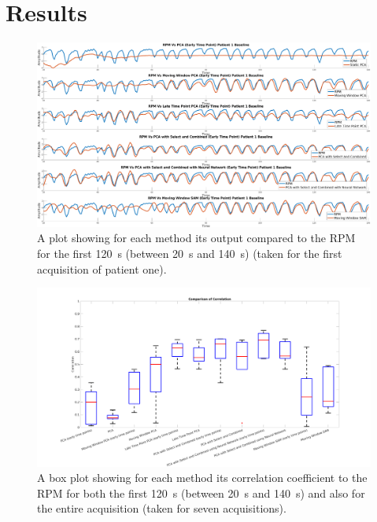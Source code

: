 \section{Results} \label{sec:results}
    \begin{figure}
        \centering
        
        \includegraphics[width=1.0\linewidth]{figures/patient_one_output.png}
        
        \captionsetup{singlelinecheck=false, justification=centering}
        \caption{
        \scriptsize
        A plot showing for each method its output compared to the \gls{RPM} for the first \SI{120}{\second} (between \SI{20}{\second} and \SI{140}{\second}) (taken for the first acquisition of patient one).}
        \label{fig:patient_one_output}
    \end{figure}
    
    \begin{figure}
        \centering
        
        \includegraphics[width=1.0\linewidth]{figures/box_plot.png}
        
        \captionsetup{singlelinecheck=false, justification=centering}
        \caption{
        \scriptsize
        A box plot showing for each method its correlation coefficient to the \gls{RPM} for both the first \SI{120}{\second} (between \SI{20}{\second} and \SI{140}{\second}) and also for the entire acquisition (taken for seven acquisitions).}
        
        \label{fig:box_plot}
    \end{figure}
    
